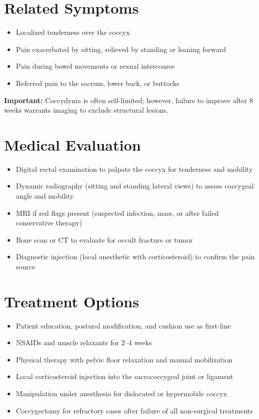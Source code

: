 \section*{Related Symptoms}
\begin{itemize}
  \item Localized tenderness over the coccyx
  \item Pain exacerbated by sitting, relieved by standing or leaning forward
  \item Pain during bowel movements or sexual intercourse
  \item Referred pain to the sacrum, lower back, or buttocks
\end{itemize}
\textbf{Important:} Coccydynia is often self-limited; however, failure to improve after 8 weeks warrants imaging to exclude structural lesions.

\section*{Medical Evaluation}
\begin{itemize}
  \item Digital rectal examination to palpate the coccyx for tenderness and mobility
  \item Dynamic radiography (sitting and standing lateral views) to assess coccygeal angle and mobility
  \item MRI if red flags present (suspected infection, mass, or after failed conservative therapy)
  \item Bone scan or CT to evaluate for occult fracture or tumor
  \item Diagnostic injection (local anesthetic with corticosteroid) to confirm the pain source
\end{itemize}

\section*{Treatment Options}
\begin{itemize}
  \item Patient education, postural modification, and cushion use as first-line
  \item NSAIDs and muscle relaxants for 2--4 weeks
  \item Physical therapy with pelvic floor relaxation and manual mobilization
  \item Local corticosteroid injection into the sacrococcygeal joint or ligament
  \item Manipulation under anesthesia for dislocated or hypermobile coccyx
  \item Coccygectomy for refractory cases after failure of all non-surgical treatments
\end{itemize}

